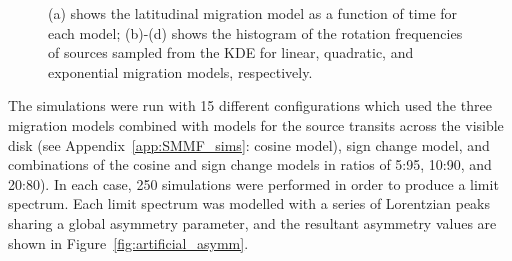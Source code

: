 \begin{figure}[!ht]
	\qquad
	
	\caption{(a) shows the latitudinal migration model as a function of time for each model; (b)-(d) shows the histogram of the rotation frequencies of sources sampled from the KDE for linear, quadratic, and exponential migration models, respectively.}
	\label{fig:artificial_sim_lats}
\end{figure}

The simulations were run with 15 different configurations which used the three migration models combined with models for the source transits across the visible disk (see Appendix~\ref{app:SMMF_sims}: cosine model), sign change model, and combinations of the cosine and sign change models in ratios of 5:95, 10:90, and 20:80). In each case, 250 simulations were performed in order to produce a limit spectrum. Each limit spectrum was modelled with a series of Lorentzian peaks sharing a global asymmetry parameter, and the resultant asymmetry values are shown in Figure~\ref{fig:artificial_asymm}.

